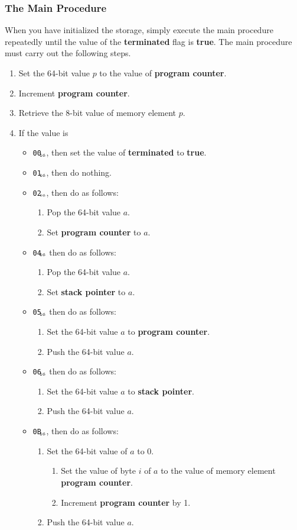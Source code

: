 \documentclass[a4paper,11pt]{article}
\newcommand{\PC}{\textbf{program counter}\xspace}
\newcommand{\SP}{\textbf{stack pointer}\xspace}
\newcommand{\TERM}{\textbf{terminated}\xspace}
\newcommand{\T}{\textbf{true}\xspace}
\newcommand{\num}[1]{\texttt{#1}\xspace}
\newcommand{\hex}[1]{\num{#1}$_{\textup{\tiny\hskip-1ex 16}}$\xspace}
\newcommand{\op}[1]{#1}
\newcommand{\EXIT}     [1]{\op{\hex{00}}\xspace}
\newcommand{\NOP}      [1]{\op{\hex{01}}\xspace}
\newcommand{\JUMP}     [1]{\op{\hex{02}}\xspace}
\newcommand{\SETSP}    [1]{\op{\hex{04}}\xspace}
\newcommand{\GETPC}    [1]{\op{\hex{05}}\xspace}
\newcommand{\GETSP}    [1]{\op{\hex{06}}\xspace}
\newcommand{\PUSHL}    [1]{\op{\hex{0B}}\xspace}
\begin{document}
\subsubsection{The Main Procedure}

When you have initialized the storage, simply execute the main procedure repeatedly until the value of the \TERM flag is \T.
The main procedure must carry out the following steps.
\begin{enumerate}
\item Set the 64-bit value $p$ to the value of \PC.
\item Increment \PC.
\item Retrieve the 8-bit value of memory element $p$.
\item\label{itm:main-case} If the value is
  \begin{itemize}
  \item \EXIT{}, then set the value of  \TERM to \T.
  \item \NOP{}, then do nothing.
  \item \JUMP{}, then do as follows:
    \begin{enumerate}
    \item Pop the 64-bit value $a$.
    \item Set \PC to $a$.
    \end{enumerate}
  \item \SETSP, then do as follows:
    \begin{enumerate}
    \item Pop the 64-bit value $a$.
    \item Set \SP to $a$.
    \end{enumerate}
  \item \GETPC, then do as follows:
    \begin{enumerate}
    \item Set the 64-bit value $a$ to \PC.
    \item Push the 64-bit value $a$.
    \end{enumerate}
  \item \GETSP, then do as follows:
    \begin{enumerate}
    \item Set the 64-bit value $a$ to \SP.
    \item Push the 64-bit value $a$.
    \end{enumerate}
  \item \PUSHL{}, then do as follows:
    \begin{enumerate}
    \item Set the 64-bit value of $a$ to 0.
      \begin{enumerate}
      \item Set the value of byte $i$ of $a$ to the value of memory element \PC.
      \item Increment \PC by 1.
      \end{enumerate}
    \item Push the 64-bit value $a$.
    \end{enumerate}
  \end{itemize}
\end{enumerate}
\end{document}
